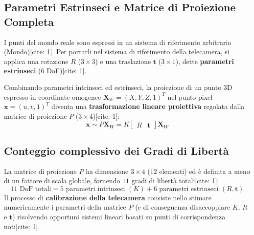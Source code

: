 \subsection{Parametri Estrinseci e Matrice di Proiezione Completa}
I punti del mondo reale sono espressi in un sistema di riferimento arbitrario (Mondo)[cite: 1]. Per portarli nel sistema di riferimento della telecamera, si applica una rotazione $R$ ($3 \times 3$) e una traslazione $\mathbf{t}$ ($3 \times 1$), dette \textbf{parametri estrinseci} ($6$ DoF)[cite: 1].

Combinando parametri intrinseci ed estrinseci, la proiezione di un punto 3D espresso in coordinate omogenee $\mathbf{X}_W = (X, Y, Z, 1)^T$ nel punto pixel $\mathbf{x} = (u, v, 1)^T$ diventa una \textbf{trasformazione lineare proiettiva} regolata dalla matrice di proiezione $P$ ($3 \times 4$)[cite: 1]:
\begin{equation}
\mathbf{x} \sim P \mathbf{X}_W = K \begin{bmatrix} R & \mathbf{t} \end{bmatrix} \mathbf{X}_W
\end{equation}

\subsection{Conteggio complessivo dei Gradi di Libertà}
La matrice di proiezione $P$ ha dimensione $3 \times 4$ ($12$ elementi) ed è definita a meno di un fattore di scala globale, fornendo $11$ gradi di libertà totali[cite: 1]:
\begin{equation}
11 \text{ DoF totali} = 5 \text{ parametri intrinseci } (K) + 6 \text{ parametri estrinseci } (R, \mathbf{t})
\end{equation}
Il processo di \textbf{calibrazione della telecamera} consiste nello stimare numericamente i parametri della matrice $P$ (e di conseguenza disaccoppiare $K$, $R$ e $\mathbf{t}$) risolvendo opportuni sistemi lineari basati su punti di corrispondenza noti[cite: 1].